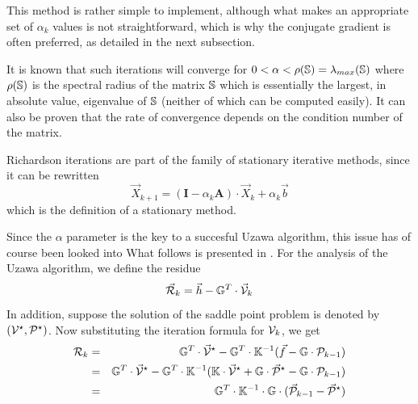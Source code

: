 This method is rather simple to implement, although
what makes an appropriate set of $\alpha_k$ values is not straightforward, which is why 
the conjugate gradient is often preferred, as detailed in the next subsection. 

It is known that such iterations will converge for $0< \alpha < \rho({\mathbb{S}})= \lambda_{max}({\mathbb{S}})$ 
where $\rho({\mathbb{S}})$ is the spectral radius of the matrix ${\mathbb{S}}$
which is essentially the largest, in absolute value, eigenvalue of ${\mathbb{S}}$ (neither of which 
can be computed easily).  
It can also be proven that the rate of convergence depends on the condition number of the matrix.

Richardson iterations are part of the family of stationary iterative methods, since it can be rewritten 
\begin{equation}
{\vec X}_{k+1} = ({\bm I} - \alpha_k {\bm A} ) \cdot {\vec X}_k + \alpha_k {\vec b}
\end{equation}
which is the definition of a stationary method. 

Since the $\alpha$ parameter is the key to a succesful Uzawa algorithm, 
this issue has of course been looked into What follows is 
presented in \cite[p221]{braess}.
For the analysis of the Uzawa algorithm, we define the residue
\[
\vec {\cal R}_k = \vec h - \mathbb{G}^T \cdot \vec{\cal V}_k
\]
In addition, suppose the solution of the saddle point problem is denoted
by $({\cal V}^\star,{\cal P}^\star)$.
Now substituting the iteration formula for ${\cal V}_k$, we get
\begin{eqnarray}
{\cal R}_k 
&=& {\mathbb{G}}^T\cdot\vec{\cal V}^\star -\mathbb{G}^T\cdot \mathbb{K}^{-1} (\vec f - \mathbb{G}\cdot {\cal P}_{k-1}) \\
&=& {\mathbb{G}}^T\cdot\vec{\cal V}^\star -\mathbb{G}^T\cdot \mathbb{K}^{-1} ({\mathbb{K}}\cdot\vec{\cal V}^\star + {\mathbb{G}}\cdot\vec{\cal P}^\star - \mathbb{G}\cdot {\cal P}_{k-1}) \\
&=& \mathbb{G}^T \cdot \mathbb{K}^{-1} \cdot \mathbb{G}\cdot (\vec {\cal P}_{k-1} - \vec{\cal P}^\star) 
\end{eqnarray}

